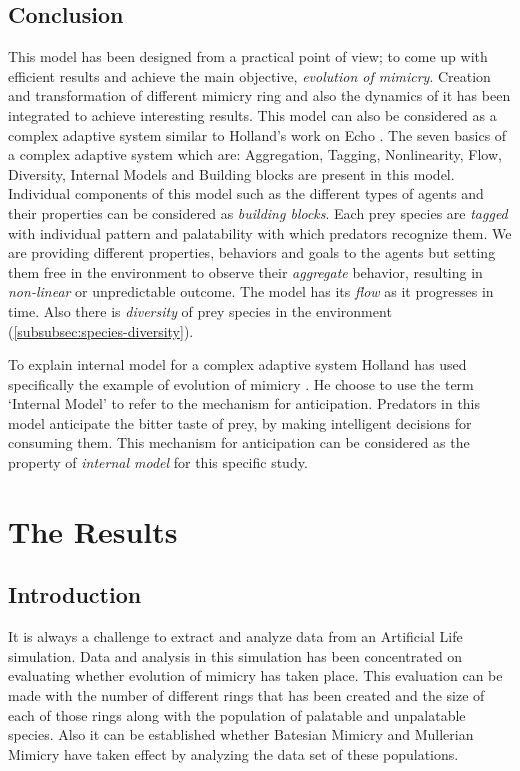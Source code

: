 \documentclass[letterpaper]{article}
\numberwithin{equation}{section}
\begin{document}
\subsection{Conclusion}
This model has been designed from a practical point of view; to come up with efficient results and achieve the main objective, \textit{evolution of mimicry}. Creation and transformation of different mimicry ring and also the dynamics of it has been integrated to achieve interesting results. This model can also be considered as a complex adaptive system similar to Holland's work on Echo \cite{holland1996}. The seven basics of a complex adaptive system which are: Aggregation, Tagging, Nonlinearity, Flow, Diversity, Internal Models and Building blocks \cite{holland1996} are present in this model. Individual components of this model such as the different types of agents and their properties can be considered as \textit{building blocks}. Each prey species are \textit{tagged} with individual pattern and palatability with which predators recognize them. We are providing different properties, behaviors and goals to the agents but setting them free in the environment to observe their \textit{aggregate} behavior, resulting in \textit{non-linear} or unpredictable outcome. The model has its \textit{flow} as it progresses in time. Also there is \textit{diversity} of prey species in the environment (\ref{subsubsec:species-diversity}).

To explain internal model for a complex adaptive system Holland has used specifically the example of evolution of mimicry \cite{holland1996}. He choose to use the term `Internal Model' to refer to the mechanism for anticipation. Predators in this model anticipate the bitter taste of prey, by making intelligent decisions for consuming them. This mechanism for anticipation can be considered as the property of \textit{internal model} for this specific study.

\section{The Results}
\label{section:results}

\subsection{Introduction}
It is always a challenge to extract and analyze data from an Artificial Life simulation. Data and analysis in this simulation has been concentrated on evaluating whether evolution of mimicry has taken place. This evaluation can be made with the number of different rings that has been created and the size of each of those rings along with the population of palatable and unpalatable species. Also it can be established whether Batesian Mimicry and Mullerian Mimicry have taken effect by analyzing the data set of these populations.
\end{document}
